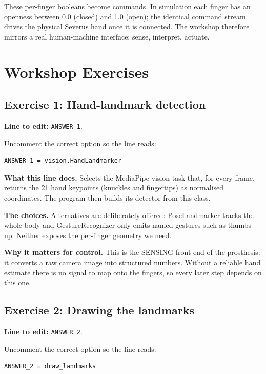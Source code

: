\documentclass[conference]{IEEEtran}
\begin{document}
These per-finger booleans become commands. In simulation each finger has an openness between 0.0 (closed) and 1.0 (open); the identical command stream drives the physical Severus hand once it is connected. The workshop therefore mirrors a real human-machine interface: sense, interpret, actuate.

\section{Workshop Exercises}

\subsection{Exercise 1: Hand-landmark detection}

\textbf{Line to edit:} \lstinline!ANSWER_1!.

Uncomment the correct option so the line reads:

\begin{lstlisting}
ANSWER_1 = vision.HandLandmarker
\end{lstlisting}


\textbf{What this line does.} Selects the MediaPipe vision task that, for every frame, returns the 21 hand keypoints (knuckles and fingertips) as normalised coordinates. The program then builds its detector from this class.

\textbf{The choices.} Alternatives are deliberately offered: PoseLandmarker tracks the whole body and GestureRecognizer only emits named gestures such as thumbs-up. Neither exposes the per-finger geometry we need.

\textbf{Why it matters for control.} This is the SENSING front end of the prosthesis: it converts a raw camera image into structured numbers. Without a reliable hand estimate there is no signal to map onto the fingers, so every later step depends on this one.

\subsection{Exercise 2: Drawing the landmarks}

\textbf{Line to edit:} \lstinline!ANSWER_2!.

Uncomment the correct option so the line reads:

\begin{lstlisting}
ANSWER_2 = draw_landmarks
\end{lstlisting}
\end{document}
